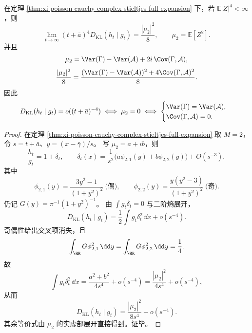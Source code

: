 \begin{corollary}[KL 主项的二阶复矩不变量]\label{cor:xi-poisson-cauchy-kl-leading-lorentz-invariant-m2}
在定理 \ref{thm:xi-poisson-cauchy-complex-stieltjes-full-expansion} 下，若 \(\mathbb E|Z|^4<\infty\)，则
\[
\lim_{t\to\infty}(t+\bar a)^4D_{\mathrm{KL}}(h_t\mid g_t)=\frac{|\mu_2|^2}{8},
\qquad \mu_2=\mathbb E[Z^2].
\]
并且
\[
\mu_2=\Var(\Gamma)-\Var(\mathcal A)+2i\,\Cov(\Gamma,\mathcal A),
\]
\[
\frac{|\mu_2|^2}{8}
=\frac{(\Var(\Gamma)-\Var(\mathcal A))^2+4\Cov(\Gamma,\mathcal A)^2}{8}.
\]
因此
\[
D_{\mathrm{KL}}(h_t\mid g_t)=o((t+\bar a)^{-4})
\iff \mu_2=0
\iff
\begin{cases}
\Var(\Gamma)=\Var(\mathcal A),\\
\Cov(\Gamma,\mathcal A)=0.
\end{cases}
\]
\end{corollary}
\begin{proof}
在定理 \ref{thm:xi-poisson-cauchy-complex-stieltjes-full-expansion} 取 \(M=2\)，令 \(s=t+\bar a\)、\(y=(x-\bar\gamma)/s\)。
写 \(\mu_2=a+ib\)，则
\[
\frac{h_t}{g_t}=1+\delta_t,\qquad
\delta_t(x)=\frac{1}{s^2}\bigl(a\phi_{2,1}(y)+b\phi_{2,2}(y)\bigr)+O(s^{-3}),
\]
其中
\[
\phi_{2,1}(y)=\frac{3y^2-1}{(1+y^2)^2}\ \text{(偶)},\qquad
\phi_{2,2}(y)=\frac{y(y^2-3)}{(1+y^2)^2}\ \text{(奇)}.
\]
仍记 \(G(y)=\pi^{-1}(1+y^2)^{-1}\)。
由 \(\int g_t\delta_t=0\) 与二阶熵展开，
\[
D_{\mathrm{KL}}(h_t\mid g_t)
=\frac12\int g_t\delta_t^2\,\dd x+o(s^{-4}).
\]
奇偶性给出交叉项消失，且
\[
\int_{\RR}G\phi_{2,1}^2\,\dd y
=\int_{\RR}G\phi_{2,2}^2\,\dd y
=\frac14.
\]
故
\[
\int g_t\delta_t^2\,\dd x
=\frac{a^2+b^2}{4s^4}+o(s^{-4})
=\frac{|\mu_2|^2}{4s^4}+o(s^{-4}),
\]
从而
\[
D_{\mathrm{KL}}(h_t\mid g_t)=\frac{|\mu_2|^2}{8s^4}+o(s^{-4}).
\]
其余等价式由 \(\mu_2\) 的实虚部展开直接得到。证毕。
\end{proof}

